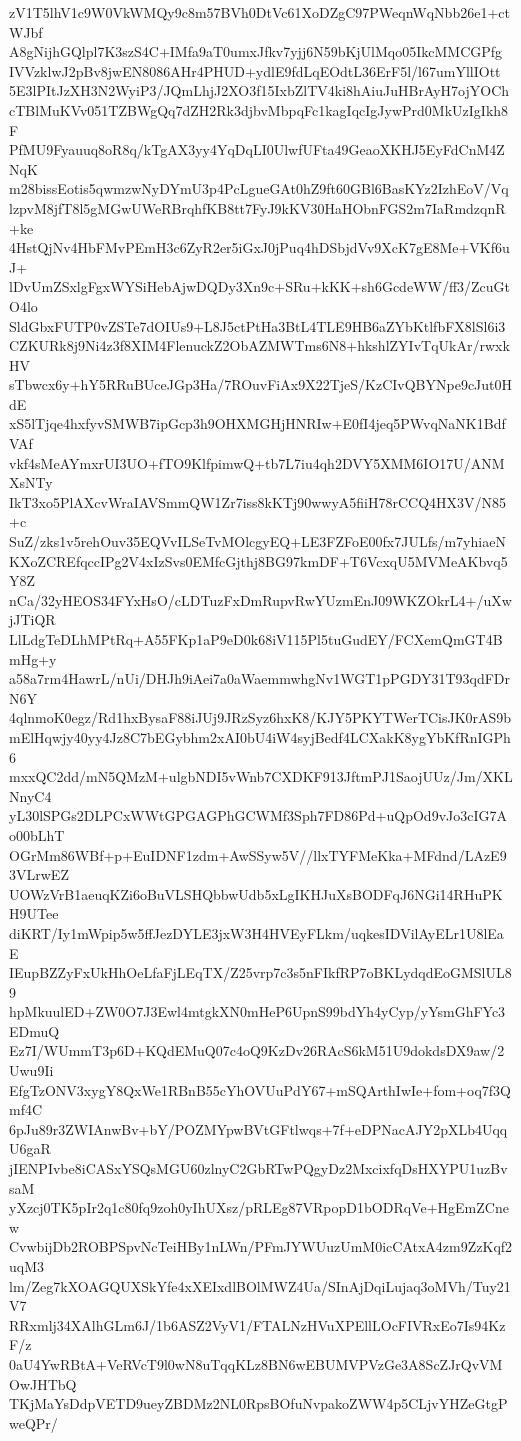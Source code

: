 zV1T5lhV1c9W0VkWMQy9c8m57BVh0DtVc61XoDZgC97PWeqnWqNbb26e1+ctWJbf
A8gNijhGQlpl7K3szS4C+IMfa9aT0umxJfkv7yjj6N59bKjUlMqo05IkcMMCGPfg
IVVzklwJ2pBv8jwEN8086AHr4PHUD+ydlE9fdLqEOdtL36ErF5l/l67umYllIOtt
5E3lPItJzXH3N2WyiP3/JQmLhjJ2XO3f15IxbZlTV4ki8hAiuJuHBrAyH7ojYOCh
cTBlMuKVv051TZBWgQq7dZH2Rk3djbvMbpqFc1kagIqcIgJywPrd0MkUzIgIkh8F
PfMU9Fyauuq8oR8q/kTgAX3yy4YqDqLI0UlwfUFta49GeaoXKHJ5EyFdCnM4ZNqK
m28bissEotis5qwmzwNyDYmU3p4PcLgueGAt0hZ9ft60GBl6BasKYz2IzhEoV/Vq
lzpvM8jfT8l5gMGwUWeRBrqhfKB8tt7FyJ9kKV30HaHObnFGS2m7IaRmdzqnR+ke
4HstQjNv4HbFMvPEmH3c6ZyR2er5iGxJ0jPuq4hDSbjdVv9XcK7gE8Me+VKf6uJ+
lDvUmZSxlgFgxWYSiHebAjwDQDy3Xn9c+SRu+kKK+sh6GcdeWW/ff3/ZcuGtO4lo
SldGbxFUTP0vZSTe7dOIUs9+L8J5ctPtHa3BtL4TLE9HB6aZYbKtlfbFX8lSl6i3
CZKURk8j9Ni4z3f8XIM4FlenuckZ2ObAZMWTms6N8+hkshlZYIvTqUkAr/rwxkHV
sTbwcx6y+hY5RRuBUceJGp3Ha/7ROuvFiAx9X22TjeS/KzCIvQBYNpe9cJut0HdE
xS5lTjqe4hxfyvSMWB7ipGcp3h9OHXMGHjHNRIw+E0fI4jeq5PWvqNaNK1BdfVAf
vkf4sMeAYmxrUI3UO+fTO9KlfpimwQ+tb7L7iu4qh2DVY5XMM6IO17U/ANMXsNTy
IkT3xo5PlAXcvWraIAVSmmQW1Zr7iss8kKTj90wwyA5fiiH78rCCQ4HX3V/N85+c
SuZ/zks1v5rehOuv35EQVvILSeTvMOlcgyEQ+LE3FZFoE00fx7JULfs/m7yhiaeN
KXoZCREfqccIPg2V4xIzSvs0EMfcGjthj8BG97kmDF+T6VcxqU5MVMeAKbvq5Y8Z
nCa/32yHEOS34FYxHsO/cLDTuzFxDmRupvRwYUzmEnJ09WKZOkrL4+/uXwjJTiQR
LlLdgTeDLhMPtRq+A55FKp1aP9eD0k68iV115Pl5tuGudEY/FCXemQmGT4BmHg+y
a58a7rm4HawrL/nUi/DHJh9iAei7a0aWaemmwhgNv1WGT1pPGDY31T93qdFDrN6Y
4qlnmoK0egz/Rd1hxBysaF88iJUj9JRzSyz6hxK8/KJY5PKYTWerTCisJK0rAS9b
mElHqwjy40yy4Jz8C7bEGybhm2xAI0bU4iW4syjBedf4LCXakK8ygYbKfRnIGPh6
mxxQC2dd/mN5QMzM+ulgbNDI5vWnb7CXDKF913JftmPJ1SaojUUz/Jm/XKLNnyC4
yL30lSPGs2DLPCxWWtGPGAGPhGCWMf3Sph7FD86Pd+uQpOd9vJo3cIG7Ao00bLhT
OGrMm86WBf+p+EuIDNF1zdm+AwSSyw5V//llxTYFMeKka+MFdnd/LAzE93VLrwEZ
UOWzVrB1aeuqKZi6oBuVLSHQbbwUdb5xLgIKHJuXsBODFqJ6NGi14RHuPKH9UTee
diKRT/Iy1mWpip5w5ffJezDYLE3jxW3H4HVEyFLkm/uqkesIDVilAyELr1U8lEaE
IEupBZZyFxUkHhOeLfaFjLEqTX/Z25vrp7c3s5nFIkfRP7oBKLydqdEoGMSlUL89
hpMkuulED+ZW0O7J3Ewl4mtgkXN0mHeP6UpnS99bdYh4yCyp/yYsmGhFYc3EDmuQ
Ez7I/WUmmT3p6D+KQdEMuQ07c4oQ9KzDv26RAcS6kM51U9dokdsDX9aw/2Uwu9Ii
EfgTzONV3xygY8QxWe1RBnB55cYhOVUuPdY67+mSQArthIwIe+fom+oq7f3Qmf4C
6pJu89r3ZWIAnwBv+bY/POZMYpwBVtGFtlwqs+7f+eDPNacAJY2pXLb4UqqU6gaR
jIENPIvbe8iCASxYSQsMGU60zlnyC2GbRTwPQgyDz2MxcixfqDsHXYPU1uzBvsaM
yXzcj0TK5pIr2q1c80fq9zoh0yIhUXsz/pRLEg87VRpopD1bODRqVe+HgEmZCnew
CvwbijDb2ROBPSpvNcTeiHBy1nLWn/PFmJYWUuzUmM0icCAtxA4zm9ZzKqf2uqM3
lm/Zeg7kXOAGQUXSkYfe4xXEIxdlBOlMWZ4Ua/SInAjDqiLujaq3oMVh/Tuy21V7
RRxmlj34XAlhGLm6J/1b6ASZ2VyV1/FTALNzHVuXPEllLOcFIVRxEo7Is94KzF/z
0aU4YwRBtA+VeRVcT9l0wN8uTqqKLz8BN6wEBUMVPVzGe3A8ScZJrQvVMOwJHTbQ
TKjMaYsDdpVETD9ueyZBDMz2NL0RpsBOfuNvpakoZWW4p5CLjvYHZeGtgPweQPr/
